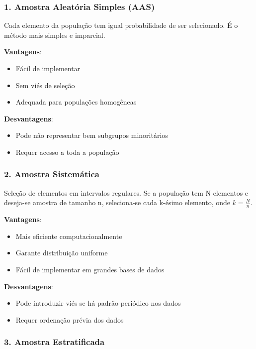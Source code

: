 \documentclass[12pt,a4paper]{article}
\begin{document}
\subsubsection{1. Amostra Aleatória Simples (AAS)}

Cada elemento da população tem igual probabilidade de ser selecionado. É o método mais simples e imparcial.

\textbf{Vantagens}:
\begin{itemize}
    \item Fácil de implementar
    \item Sem viés de seleção
    \item Adequada para populações homogêneas
\end{itemize}

\textbf{Desvantagens}:
\begin{itemize}
    \item Pode não representar bem subgrupos minoritários
    \item Requer acesso a toda a população
\end{itemize}

\subsubsection{2. Amostra Sistemática}

Seleção de elementos em intervalos regulares. Se a população tem N elementos e deseja-se amostra de tamanho n, seleciona-se cada k-ésimo elemento, onde $k = \frac{N}{n}$.

\textbf{Vantagens}:
\begin{itemize}
    \item Mais eficiente computacionalmente
    \item Garante distribuição uniforme
    \item Fácil de implementar em grandes bases de dados
\end{itemize}

\textbf{Desvantagens}:
\begin{itemize}
    \item Pode introduzir viés se há padrão periódico nos dados
    \item Requer ordenação prévia dos dados
\end{itemize}

\subsubsection{3. Amostra Estratificada}
\end{document}
